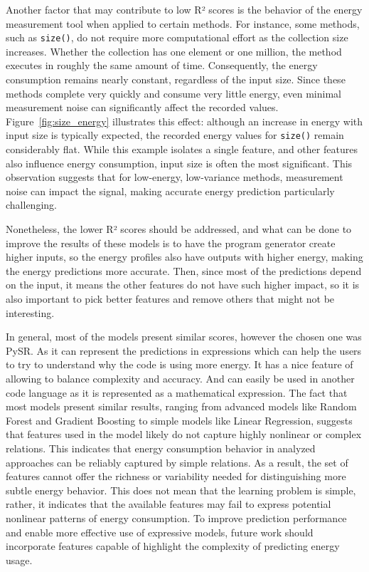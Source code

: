 Another factor that may contribute to low R² scores is the behavior of the energy measurement tool when applied to certain methods. For instance, some methods, such as \texttt{size()}, do not require more computational effort as the collection size increases. Whether the collection has one element or one million, the method executes in roughly the same amount of time. Consequently, the energy consumption remains nearly constant, regardless of the input size. Since these methods complete very quickly and consume very little energy, even minimal measurement noise can significantly affect the recorded values. Figure~\ref{fig:size_energy} illustrates this effect: although an increase in energy with input size is typically expected, the recorded energy values for \texttt{size()} remain considerably flat. While this example isolates a single feature, and other features also influence energy consumption, input size is often the most significant. This observation suggests that for low-energy, low-variance methods, measurement noise can impact the signal, making accurate energy prediction particularly challenging.


Nonetheless, the lower R² scores should be addressed, and what can be done to improve the results of these models is to have the program generator create higher inputs, so the energy profiles also have outputs with higher energy, making the energy predictions more accurate. Then, since most of the predictions depend on the input, it means the other features do not have such higher impact, so it is also important to pick better features and remove others that might not be interesting. 



In general, most of the models present similar scores, however the chosen one was PySR. As it can represent the predictions in expressions which can help the users to try to understand why the code is using more energy. It has a nice feature of allowing to balance complexity and accuracy. And can easily be used in another code language as it is represented as a mathematical expression.
The fact that most models present similar results, ranging from advanced models like Random Forest and Gradient Boosting to simple models like Linear Regression, suggests that features used in the model likely do not capture highly nonlinear or complex relations. This indicates that energy consumption behavior in analyzed approaches can be reliably captured by simple relations. As a result, the set of features cannot offer the richness or variability needed for distinguishing more subtle energy behavior. This does not mean that the learning problem is simple, rather, it indicates that the available features may fail to express potential nonlinear patterns of energy consumption. To improve prediction performance and enable more effective use of expressive models, future work should incorporate features capable of highlight the complexity of predicting energy usage.



